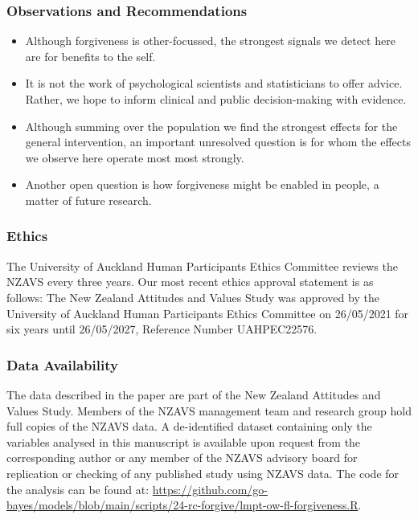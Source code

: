 \documentclass[
  single column]{article}
\begin{document}
\subsubsection{Observations and
Recommendations}\label{observations-and-recommendations}

\begin{itemize}
\item
  Although forgiveness is other-focussed, the strongest signals we
  detect here are for benefits to the self.
\item
  It is not the work of psychological scientists and statisticians to
  offer advice. Rather, we hope to inform clinical and public
  decision-making with evidence.
\item
  Although summing over the population we find the strongest effects for
  the general intervention, an important unresolved question is for whom
  the effects we observe here operate most most strongly.
\item
  Another open question is how forgiveness might be enabled in people, a
  matter of future research.
\end{itemize}

\newpage{}

\subsubsection{Ethics}\label{ethics}

The University of Auckland Human Participants Ethics Committee reviews
the NZAVS every three years. Our most recent ethics approval statement
is as follows: The New Zealand Attitudes and Values Study was approved
by the University of Auckland Human Participants Ethics Committee on
26/05/2021 for six years until 26/05/2027, Reference Number UAHPEC22576.

\subsubsection{Data Availability}\label{data-availability}

The data described in the paper are part of the New Zealand Attitudes
and Values Study. Members of the NZAVS management team and research
group hold full copies of the NZAVS data. A de-identified dataset
containing only the variables analysed in this manuscript is available
upon request from the corresponding author or any member of the NZAVS
advisory board for replication or checking of any published study using
NZAVS data. The code for the analysis can be found at:
\url{https://github.com/go-bayes/models/blob/main/scripts/24-rc-forgive/lmpt-ow-fl-forgiveness.R}.
\end{document}
